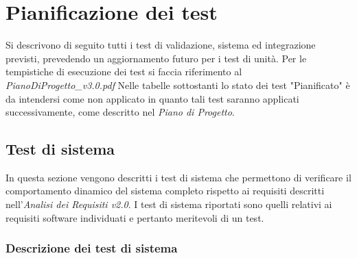 \newcommand{\teststatus}{Success}

\section {Pianificazione dei test}

Si descrivono di seguito tutti i test di validazione, sistema ed integrazione previsti, prevedendo un aggiornamento futuro per i test di unità. Per le tempistiche di esecuzione dei test si faccia riferimento al \textit{PianoDiProgetto\_v3.0.pdf} Nelle tabelle sottostanti lo stato dei test "Pianificato" è da intendersi come non applicato in quanto tali test saranno applicati successivamente, come descritto nel \textit{Piano di Progetto}.

\subsection {Test di sistema}

In questa sezione vengono descritti i test di sistema che permettono di verificare il comportamento dinamico del sistema completo rispetto ai requisiti descritti nell'\textit{Analisi dei Requisiti v2.0}.
I test di sistema riportati sono quelli relativi ai requisiti software individuati e pertanto meritevoli di un test.

\subsubsection{Descrizione dei test di sistema}

